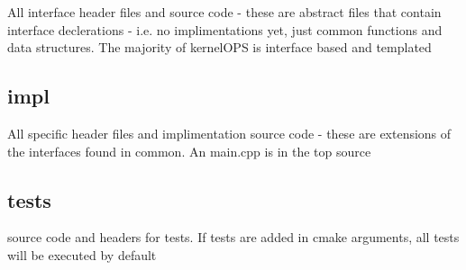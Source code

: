 All interface header files and source code -\/ these are abstract files that contain interface declerations -\/ i.\+e. no implimentations yet, just common functions and data structures. The majority of kernel\+O\+PS is interface based and templated

\subsection*{impl}

All specific header files and implimentation source code -\/ these are extensions of the interfaces found in common. An main.\+cpp is in the top source

\subsection*{tests}

source code and headers for tests. If tests are added in cmake arguments, all tests will be executed by default 